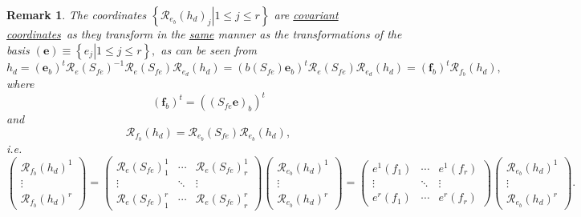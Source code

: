 \documentclass[aps,preprint]{revtex4}
\newtheorem{remark}[theorem]{Remark}
\begin{document}
\begin{remark}
The coordinates $\left\{ \left. \mathcal{R}_{e_{b}}\left( h_{d}\right)
_{j}\right\vert 1\leq j\leq r\right\} $ are \underline{\emph{covariant
coordinates}}\emph{\ }as they transform in the \underline{same} manner as
the transformations of the basis $\left( \boldsymbol{e}\right) \equiv
\left\{ \left. e_{j}\right\vert 1\leq j\leq r\right\} ,$ as can be seen from 
\begin{equation}
h_{d}=\left( \boldsymbol{e}_{b}\right) ^{t}\mathcal{R}_{e}\left(
S_{fe}\right) ^{-1}\mathcal{R}_{e}\left( S_{fe}\right) \mathcal{R}%
_{e_{d}}\left( h_{d}\right) =\left( b\left( S_{fe}\right) \boldsymbol{e}%
_{b}\right) ^{t}\mathcal{R}_{e}\left( S_{fe}\right) \mathcal{R}%
_{e_{d}}\left( h_{d}\right) =\left( \boldsymbol{f}_{b}\right) ^{t}\mathcal{R}%
_{f_{b}}\left( h_{d}\right) ,
\end{equation}%
where 
\begin{equation}
\left( \boldsymbol{f}_{b}\right) ^{t}=\left( \left( S_{fe}\boldsymbol{e}%
\right) _{b}\right) ^{t}
\end{equation}%
and 
\begin{equation}
\mathcal{R}_{f_{b}}\left( h_{d}\right) =\mathcal{R}_{e_{b}}\left(
S_{fe}\right) \mathcal{R}_{e_{b}}\left( h_{d}\right) ,
\end{equation}%
i.e. 
\begin{equation}
\left( 
\begin{array}{c}
\mathcal{R}_{f_{b}}\left( h_{d}\right) ^{1} \\ 
\vdots \\ 
\mathcal{R}_{f_{b}}\left( h_{d}\right) ^{r}%
\end{array}%
\right) =\left( 
\begin{array}{ccc}
\mathcal{R}_{e}\left( S_{fe}\right) _{1}^{1} & \cdots & \mathcal{R}%
_{e}\left( S_{fe}\right) _{r}^{1} \\ 
\vdots & \ddots & \vdots \\ 
\mathcal{R}_{e}\left( S_{fe}\right) _{1}^{r} & \cdots & \mathcal{R}%
_{e}\left( S_{fe}\right) _{r}^{r}%
\end{array}%
\right) \left( 
\begin{array}{c}
\mathcal{R}_{e_{b}}\left( h_{d}\right) ^{1} \\ 
\vdots \\ 
\mathcal{R}_{e_{b}}\left( h_{d}\right) ^{r}%
\end{array}%
\right) =\left( 
\begin{array}{ccc}
e^{1}\left( f_{1}\right) & \cdots & e^{1}\left( f_{r}\right) \\ 
\vdots & \ddots & \vdots \\ 
e^{r}\left( f_{1}\right) & \cdots & e^{r}\left( f_{r}\right)%
\end{array}%
\right) \left( 
\begin{array}{c}
\mathcal{R}_{e_{b}}\left( h_{d}\right) ^{1} \\ 
\vdots \\ 
\mathcal{R}_{e_{b}}\left( h_{d}\right) ^{r}%
\end{array}%
\right) .
\end{equation}
\end{remark}
\end{document}

